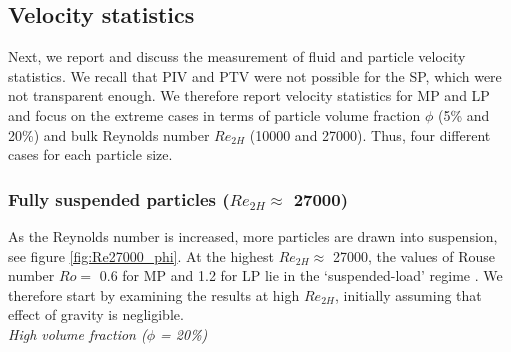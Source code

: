 \documentclass{jfm}
\begin{document}
\subsection{Velocity statistics}
\label{subsec:Velocity Statistics}

Next, we report and discuss the measurement of fluid and particle velocity statistics. We recall that PIV and PTV were not possible for the SP, which were not transparent enough. We therefore report velocity statistics for MP and LP and focus on the extreme cases in terms of particle volume fraction $\phi$ (5\% and 20\%) and bulk Reynolds number $Re_{2H}$ (10000 and 27000). Thus, four different cases for each particle size.


\subsubsection{Fully suspended particles ($Re_{2H}\approx$ 27000)}
\label{sec: Velocity statistics Fully suspended}

As the Reynolds number is increased, more particles are drawn into suspension, see figure \ref{fig:Re27000_phi}. At the highest $Re_{2H}\approx$ 27000, the values of Rouse number $Ro=$ 0.6 for MP and 1.2 for LP lie in the `suspended-load' regime \citep{fredsoe1992mechanics}. 
We therefore start by examining the results at high $Re_{2H}$, initially assuming that effect of gravity is negligible.\\



{\it High volume fraction ($\phi$ = 20\%)}\\
\end{document}
